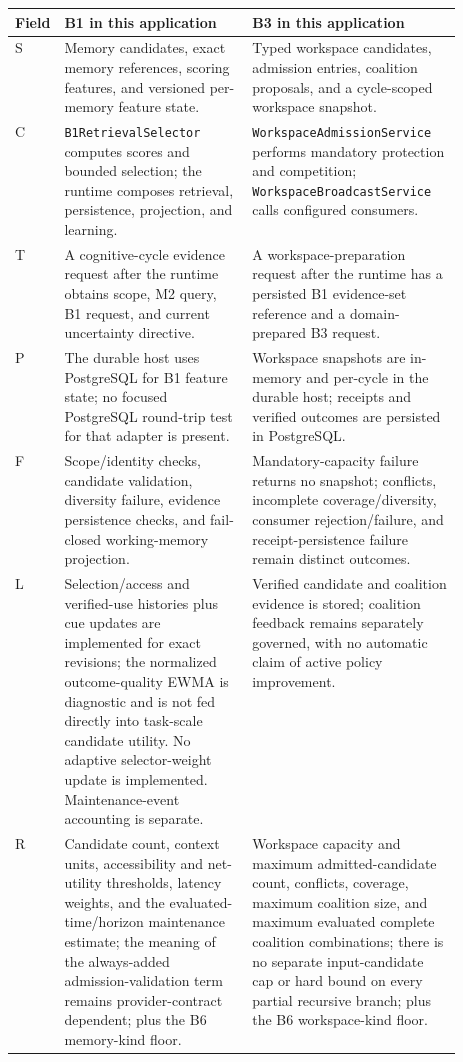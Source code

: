 \begin{table}[htbp]
\centering
\small
\begin{tabularx}{\linewidth}{>{\raggedright\arraybackslash}p{0.10\linewidth}>{\raggedright\arraybackslash}p{0.42\linewidth}X}
\toprule
\textbf{Field} & \textbf{B1 in this application} & \textbf{B3 in this application} \\
\midrule
S & Memory candidates, exact memory references, scoring features, and versioned per-memory feature state. & Typed workspace candidates, admission entries, coalition proposals, and a cycle-scoped workspace snapshot. \\
C & \texttt{B1RetrievalSelector} computes scores and bounded selection; the runtime composes retrieval, persistence, projection, and learning. & \texttt{Workspace\allowbreak{}Admission\allowbreak{}Service} performs mandatory protection and competition; \texttt{Workspace\allowbreak{}Broadcast\allowbreak{}Service} calls configured consumers. \\
T & A cognitive-cycle evidence request after the runtime obtains scope, M2 query, B1 request, and current uncertainty directive. & A workspace-preparation request after the runtime has a persisted B1 evidence-set reference and a domain-prepared B3 request. \\
P & The durable host uses PostgreSQL for B1 feature state; no focused PostgreSQL round-trip test for that adapter is present. & Workspace snapshots are in-memory and per-cycle in the durable host; receipts and verified outcomes are persisted in PostgreSQL. \\
F & Scope/identity checks, candidate validation, diversity failure, evidence persistence checks, and fail-closed working-memory projection. & Mandatory-capacity failure returns no snapshot; conflicts, incomplete coverage/diversity, consumer rejection/failure, and receipt-persistence failure remain distinct outcomes. \\
L & Selection/access and verified-use histories plus cue updates are implemented for exact revisions; the normalized outcome-quality EWMA is diagnostic and is not fed directly into task-scale candidate utility. No adaptive selector-weight update is implemented. Maintenance-event accounting is separate. & Verified candidate and coalition evidence is stored; coalition feedback remains separately governed, with no automatic claim of active policy improvement. \\
R & Candidate count, context units, accessibility and net-utility thresholds, latency weights, and the evaluated-time/horizon maintenance estimate; the meaning of the always-added admission-validation term remains provider-contract dependent; plus the B6 memory-kind floor. & Workspace capacity and maximum admitted-candidate count, conflicts, coverage, maximum coalition size, and maximum evaluated complete coalition combinations; there is no separate input-candidate cap or hard bound on every partial recursive branch; plus the B6 workspace-kind floor. \\

\end{tabularx}
\end{table}
